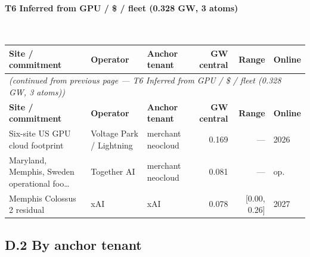 \documentclass[11pt,a4paper]{article}
\begin{document}
\paragraph{\textbf{T6 Inferred from GPU / \$ / fleet (0.328 GW, 3 atoms)}}~\\[0.3em]
\noindent\begin{small}
\begin{longtable}{@{}p{4.5cm} p{2.4cm} p{2.4cm} r r p{1.8cm}@{}}
\toprule
\textbf{Site / commitment} & \textbf{Operator} & \textbf{Anchor tenant} & \textbf{GW central} & \textbf{Range} & \textbf{Online} \\
\midrule
\endfirsthead
\multicolumn{6}{l}{\textit{(continued from previous page — T6 Inferred from GPU / \$ / fleet (0.328 GW, 3 atoms))}} \\
\toprule
\textbf{Site / commitment} & \textbf{Operator} & \textbf{Anchor tenant} & \textbf{GW central} & \textbf{Range} & \textbf{Online} \\
\midrule
\endhead
\bottomrule
\endfoot

Six-site US GPU cloud footprint & Voltage Park / Lightning & merchant neocloud & 0.169 & — & 2026 \\

Maryland, Memphis, Sweden operational foo… & Together AI & merchant neocloud & 0.081 & — & op. \\

Memphis Colossus 2 residual & xAI & xAI & 0.078 & [0.00, 0.26] & 2027 \\

\end{longtable}\end{small}


\subsection*{D.2 \quad By anchor tenant}
\end{document}
